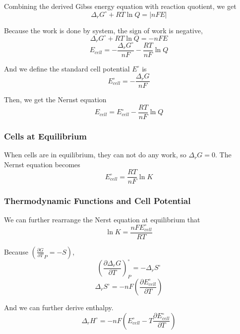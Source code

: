 \documentclass[letterpaper]{article}
\newcommand{\zero}{^\circ}
\begin{document}
Combining the derived Gibss energy equation with reaction quotient, we get
\begin{equation*}
    \Delta_rG\zero+RT\ln Q=|nFE|
\end{equation*}

Because the work is done by system, the sign of work is negative,
\begin{equation*}
    \Delta_rG\zero+RT\ln Q=-nFE
\end{equation*}
\begin{equation*}
    E_{cell}=-\frac{\Delta_rG\zero}{nF}-\frac{RT}{nF}\ln Q
\end{equation*}

And we define the standard cell potential $E\zero$ is
\begin{equation*}
    E_{cell}\zero=-\frac{\Delta_rG}{nF}
\end{equation*}

Then, we get the Nernst equation
\begin{equation*}
    \boxed{E_{cell}=E_{cell}\zero-\frac{RT}{nF}\ln Q}
\end{equation*}
\subsubsection*{Cells at Equilibrium}
When cells are in equilibrium, they can not do any work, so $\Delta_rG=0$. The Nernst equation
becomes
\begin{equation*}
    E_{cell}\zero=\frac{RT}{nF}\ln K
\end{equation*}
\subsubsection*{Thermodynamic Functions and Cell Potential}
We can further rearrange the Nerst equation at equilibrium that
\begin{equation*}
    \ln K=\frac{nFE_{cell}\zero}{RT}
\end{equation*}

Because $\left(\frac{\partial G}{\partial T}_P=-S\right)$,
\begin{equation*}
    \left(\frac{\partial \Delta_rG}{\partial T}\right)\zero_P=-\Delta_rS\zero
\end{equation*}
\begin{equation*}
    \Delta_rS\zero=-nF\left(\frac{\partial E_{cell}\zero}{\partial T}\right)
\end{equation*}

And we can further derive enthalpy.
\begin{equation*}
    \Delta_rH\zero=-nF(E_{cell}\zero-T\frac{\partial E_{cell}\zero}{\partial T})
\end{equation*}
\end{document}
